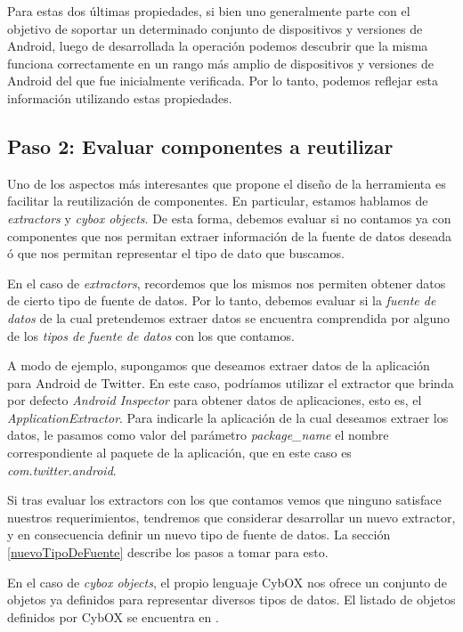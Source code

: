 Para estas dos últimas propiedades, si bien uno generalmente parte con el objetivo de soportar un determinado conjunto de dispositivos y versiones de Android, luego de desarrollada la operación podemos descubrir que la misma funciona correctamente en un rango más amplio de dispositivos y versiones de Android del que fue inicialmente verificada. Por lo tanto, podemos reflejar esta información utilizando estas propiedades.

\subsection*{Paso 2: Evaluar componentes a reutilizar}
Uno de los aspectos más interesantes que propone el diseño de la herramienta es facilitar la reutilización de componentes. En particular, estamos hablamos de \emph{extractors} y \emph{cybox objects}. De esta forma, debemos evaluar si no contamos ya con componentes que nos permitan extraer información de la fuente de datos deseada ó que nos permitan representar el tipo de dato que buscamos.

En el caso de \emph{extractors}, recordemos que los mismos nos permiten obtener datos de cierto tipo de fuente de datos. Por lo tanto, debemos evaluar si la \emph{fuente de datos} de la cual pretendemos extraer datos se encuentra comprendida por alguno de los \emph{tipos de fuente de datos} con los que contamos.

A modo de ejemplo, supongamos que deseamos extraer datos de la aplicación para Android de Twitter. En este caso, podríamos utilizar el extractor que brinda por defecto \emph{Android Inspector} para obtener datos de aplicaciones, esto es, el \emph{ApplicationExtractor}. Para indicarle la aplicación de la cual deseamos extraer los datos, le pasamos como valor del parámetro \emph{package\_name} el nombre correspondiente al paquete de la aplicación, que en este caso es \emph{com.twitter.android}.

Si tras evaluar los extractors con los que contamos vemos que ninguno satisface nuestros requerimientos, tendremos que considerar desarrollar un nuevo extractor, y en consecuencia definir un nuevo tipo de fuente de datos. La sección \ref{nuevoTipoDeFuente} describe los pasos a tomar para esto.

En el caso de \emph{cybox objects}, el propio lenguaje CybOX nos ofrece un conjunto de objetos ya definidos para representar diversos tipos de datos. El listado de objetos definidos por CybOX se encuentra en \cite{objectosCybOX}.


